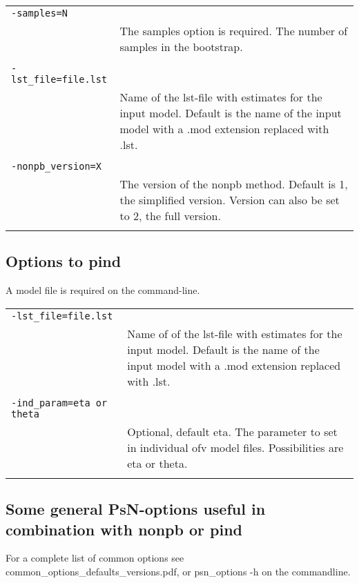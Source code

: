 \documentclass[a4paper,12pt]{article}
\begin{document}
\begin{longtable}{p{1in}p{4in}}
\verb|-samples=N| & \\
\nopagebreak
 & The samples option is required. The number of samples in the bootstrap. \\
\\
\verb|-lst_file=file.lst| & \\
\nopagebreak
 & Name of the lst-file with estimates for the input model. Default is the name of the input model with a .mod extension	replaced with .lst. \\
\\
\verb|-nonpb_version=X| & \\
\nopagebreak
 & The version of the nonpb method. Default is 1, the simplified version. Version can also be set to 2, the full version. \\
\\
\end{longtable}

\subsection{Options to pind}
A model file is required on the command-line.

\begin{longtable}{p{1in}p{4in}}
\verb|-lst_file=file.lst| & \\
\nopagebreak
 & Name of  of the lst-file with estimates for the input model. Default is the name of the input model with a .mod extension replaced with .lst. \\
\\
\verb|-ind_param=eta or theta| & \\
\nopagebreak
 & Optional, default eta. The parameter to set in individual ofv model files. Possibilities are eta or theta. \\
\\
\end{longtable}

\subsection{Some general PsN-options useful in combination with nonpb or pind}

For a complete list of common options see common\_options\_defaults\_versions.pdf, or psn\_options -h on the commandline.
\end{document}
